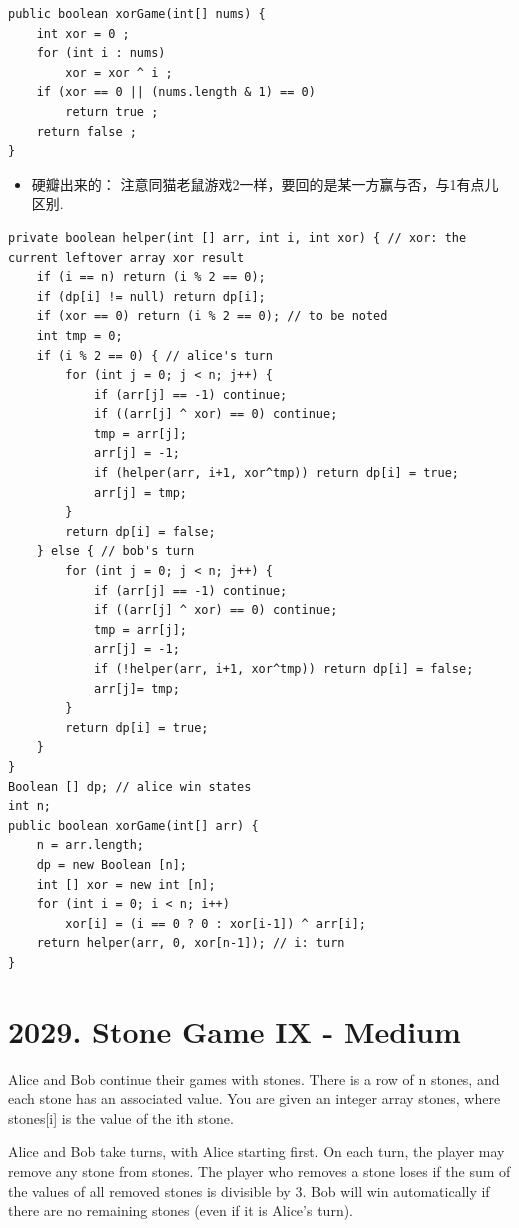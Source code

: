 \documentclass[9pt, b5paaper]{book}
\begin{document}
\begin{verbatim}
public boolean xorGame(int[] nums) {
    int xor = 0 ;
    for (int i : nums) 
        xor = xor ^ i ;
    if (xor == 0 || (nums.length & 1) == 0)
        return true ;
    return false ;
}
\end{verbatim}
\begin{itemize}
\item 硬瓣出来的： 注意同猫老鼠游戏2一样，要回的是某一方赢与否，与1有点儿区别.
\end{itemize}
\begin{verbatim}
private boolean helper(int [] arr, int i, int xor) { // xor: the current leftover array xor result
    if (i == n) return (i % 2 == 0);
    if (dp[i] != null) return dp[i];
    if (xor == 0) return (i % 2 == 0); // to be noted
    int tmp = 0;
    if (i % 2 == 0) { // alice's turn
        for (int j = 0; j < n; j++) {
            if (arr[j] == -1) continue;
            if ((arr[j] ^ xor) == 0) continue;
            tmp = arr[j];
            arr[j] = -1;
            if (helper(arr, i+1, xor^tmp)) return dp[i] = true;
            arr[j] = tmp;
        }
        return dp[i] = false;
    } else { // bob's turn
        for (int j = 0; j < n; j++) {
            if (arr[j] == -1) continue;
            if ((arr[j] ^ xor) == 0) continue;
            tmp = arr[j];
            arr[j] = -1;
            if (!helper(arr, i+1, xor^tmp)) return dp[i] = false;
            arr[j]= tmp;
        }
        return dp[i] = true;
    }
}
Boolean [] dp; // alice win states
int n;
public boolean xorGame(int[] arr) {
    n = arr.length;
    dp = new Boolean [n];
    int [] xor = new int [n];
    for (int i = 0; i < n; i++) 
        xor[i] = (i == 0 ? 0 : xor[i-1]) ^ arr[i];
    return helper(arr, 0, xor[n-1]); // i: turn
}
\end{verbatim}

\section{2029. Stone Game IX - Medium}
\label{sec-1-22}
Alice and Bob continue their games with stones. There is a row of n stones, and each stone has an associated value. You are given an integer array stones, where stones[i] is the value of the ith stone.

Alice and Bob take turns, with Alice starting first. On each turn, the player may remove any stone from stones. The player who removes a stone loses if the sum of the values of all removed stones is divisible by 3. Bob will win automatically if there are no remaining stones (even if it is Alice's turn).
\end{document}
